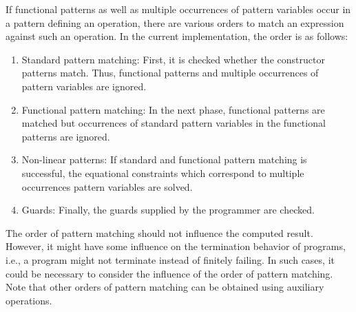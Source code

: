If functional patterns as well as multiple occurrences of
pattern variables occur in a pattern defining an operation,
there are various orders to match an expression against such
an operation. In the current implementation, the order
is as follows:
\begin{enumerate}
\item Standard pattern matching: First, it is checked whether
the constructor patterns match. Thus, functional patterns
and multiple occurrences of pattern variables are ignored.
\item Functional pattern matching: In the next phase,
functional patterns are matched but occurrences of standard
pattern variables in the functional patterns are ignored.
\item Non-linear patterns: If standard and functional pattern matching
is successful, the equational constraints which correspond
to multiple occurrences pattern variables are solved.
\item Guards: Finally, the guards supplied by the programmer
are checked.
\end{enumerate}
The order of pattern matching should not influence the computed
result. However, it might have some influence on the termination
behavior of programs, i.e., a program might not terminate
instead of finitely failing.
In such cases, it could be necessary to consider the influence
of the order of pattern matching. Note that other orders of pattern matching
can be obtained using auxiliary operations.




